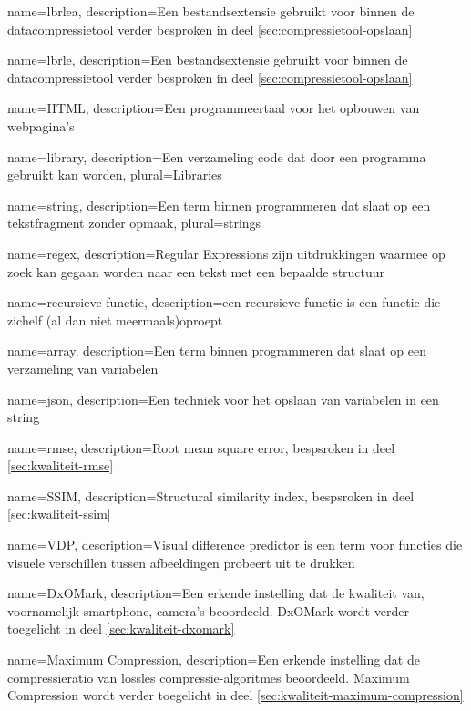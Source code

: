 {
	name={lbrlea},
	description={Een bestandsextensie gebruikt voor binnen de datacompressietool verder besproken in deel \ref{sec:compressietool-opslaan}}
}

{
	name={lbrle},
	description={Een bestandsextensie gebruikt voor binnen de datacompressietool verder besproken in deel \ref{sec:compressietool-opslaan}}
}

{
	name={HTML},
	description={Een programmeertaal voor het opbouwen van webpagina's}
}

{
	name={library},
	description={Een verzameling code dat door een programma gebruikt kan worden},
	plural={Libraries}
}

{
	name={string},
	description={Een term binnen programmeren dat slaat op een tekstfragment zonder opmaak},
	plural={strings}
}

{
	name={regex},
	description={Regular Expressions zijn uitdrukkingen waarmee op zoek kan gegaan worden naar een tekst met een bepaalde structuur}
}

{
	name={recursieve functie},
	description={een recursieve functie is een functie die zichelf (al dan niet meermaals)oproept}
}

{
	name={array},
	description={Een term binnen programmeren dat slaat op een verzameling van variabelen}
}

{
	name={json},
	description={Een techniek voor het opslaan van variabelen in een string}
}

{
	name={rmse},
	description={Root mean square error, bespsroken in deel \ref{sec:kwaliteit-rmse}}
}

{
	name={SSIM},
	description={Structural similarity index, bespsroken in deel \ref{sec:kwaliteit-ssim}}
}

{
	name={VDP},
	description={Visual difference predictor is een term voor functies die visuele verschillen tussen afbeeldingen probeert uit te drukken}
}

{
	name={DxOMark},
	description={Een erkende instelling dat de kwaliteit van, voornamelijk smartphone, camera's beoordeeld. DxOMark wordt verder toegelicht in deel \ref{sec:kwaliteit-dxomark}}
}

{
	name={Maximum Compression},
	description={Een erkende instelling dat de compressieratio van lossles compressie-algoritmes beoordeeld. Maximum Compression wordt verder toegelicht in deel \ref{sec:kwaliteit-maximum-compression}}
}

